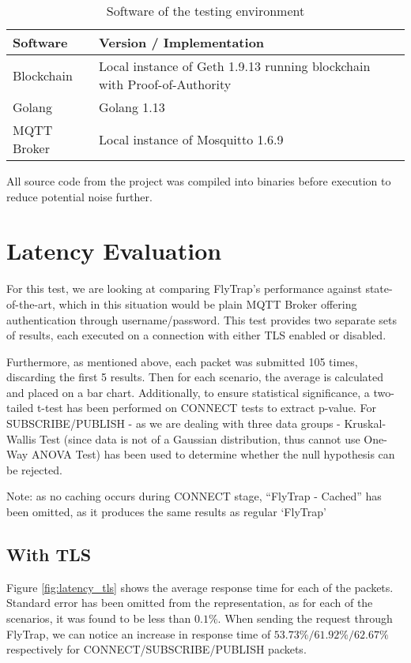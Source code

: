 \begin{table}[h]
\centering
\begin{tabular}{|l|l|}
\hline
\textbf{Software} & \textbf{Version / Implementation}                                        \\ \hline
Blockchain        & Local instance of Geth 1.9.13 running blockchain with Proof-of-Authority \\ \hline
Golang            & Golang 1.13                                                              \\ \hline
MQTT Broker       & Local instance of Mosquitto 1.6.9                                        \\ \hline
\end{tabular}
\caption{Software of the testing environment}
\label{tab:sw}
\end{table}

All source code from the project was compiled into binaries before execution to reduce potential noise further.

\section{Latency Evaluation}
For this test, we are looking at comparing FlyTrap's performance against state-of-the-art, which in this situation would be plain MQTT Broker offering authentication through username/password. This test provides two separate sets of results, each executed on a connection with either TLS enabled or disabled.

Furthermore, as mentioned above, each packet was submitted 105 times, discarding the first 5 results. Then for each scenario, the average is calculated and placed on a bar chart. Additionally, to ensure statistical significance, a two-tailed t-test has been performed on CONNECT tests to extract p-value. For SUBSCRIBE/PUBLISH - as we are dealing with three data groups - Kruskal-Wallis Test (since data is not of a Gaussian distribution, thus cannot use One-Way ANOVA Test) has been used to determine whether the null hypothesis can be rejected.

Note: as no caching occurs during CONNECT stage, ``FlyTrap - Cached'' has been omitted, as it produces the same results as regular `FlyTrap'

\subsection{With TLS}\label{sec:tls_eval}
Figure \ref{fig:latency_tls} shows the average response time for each of the packets. Standard error has been omitted from the representation, as for each of the scenarios, it was found to be less than $0.1\%$. When sending the request through FlyTrap, we can notice an increase in response time of $53.73\%/61.92\%/62.67\%$ respectively for CONNECT/SUBSCRIBE/PUBLISH packets.

